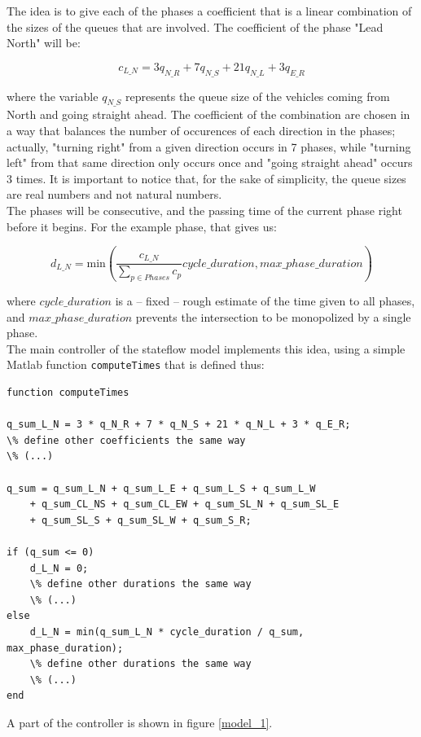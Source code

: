 \documentclass[paper=a4, fontsize=11pt]{scrartcl}
\numberwithin{figure}{section}			%
\numberwithin{table}{section}				%
\begin{document}
The idea is to give each of the phases a coefficient that is a linear combination of the sizes of the queues that are involved. The coefficient of the phase "Lead North" will be:

\[
c_{L\_N} = 3 q_{N\_R} + 7 q_{N\_S} + 21 q_{N\_L} + 3 q_{E\_R}
\]

where the variable \(q_{N\_S}\) represents the queue size of the vehicles coming from North and going straight ahead. The coefficient of the combination are chosen in a way that balances the number of occurences of each direction in the phases; actually, "turning right" from a given direction occurs in 7 phases, while "turning left" from that same direction only occurs once and "going straight ahead" occurs 3 times. It is important to notice that, for the sake of simplicity, the queue sizes are real numbers and not natural numbers.\\

The phases will be consecutive, and the passing time of the current phase right before it begins. For the example phase, that gives us:

\[
d_{L\_N} = \text{min}\left(\dfrac{c_{L\_N}}{\sum_{p \in Phases} c_p} cycle\_duration, max\_phase\_duration\right)
\]

where \(cycle\_duration\) is a -- fixed -- rough estimate of the time given to all phases, and \(max\_phase\_duration\) prevents the intersection to be monopolized by a single phase.\\

The main controller of the stateflow model implements this idea, using a simple Matlab function \texttt{computeTimes} that is defined thus:

\begin{verbatim}
function computeTimes

q_sum_L_N = 3 * q_N_R + 7 * q_N_S + 21 * q_N_L + 3 * q_E_R;
\% define other coefficients the same way
\% (...)

q_sum = q_sum_L_N + q_sum_L_E + q_sum_L_S + q_sum_L_W
	+ q_sum_CL_NS + q_sum_CL_EW + q_sum_SL_N + q_sum_SL_E
	+ q_sum_SL_S + q_sum_SL_W + q_sum_S_R;

if (q_sum <= 0)
    d_L_N = 0;
    \% define other durations the same way
    \% (...)
else
    d_L_N = min(q_sum_L_N * cycle_duration / q_sum, max_phase_duration);
    \% define other durations the same way
    \% (...)
end
\end{verbatim}

A part of the controller is shown in figure \ref{model_1}.
\end{document}
